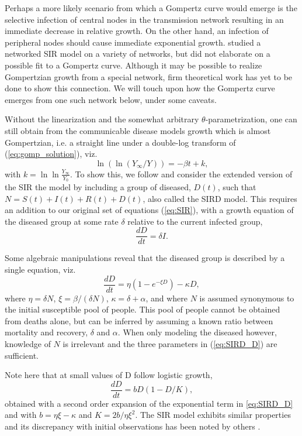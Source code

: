 \documentclass{article}
\begin{document}
 Perhaps a more likely scenario from which a Gompertz curve would emerge is the selective infection of central nodes in the transmission network resulting in an immediate decrease in relative growth. 
 On the other hand, an infection of peripheral nodes should cause immediate exponential growth. 
 \citet{herrmann2020covid} studied a networked SIR model on a variety of networks, but did not elaborate on a possible fit to a Gompertz curve. 
 Although it may be possible to realize Gompertzian growth from a special network, firm theoretical work has yet to be done to show this connection. 
 We will touch upon how the Gompertz curve emerges from one such network below, under some caveats.

Without the linearization and the somewhat arbitrary $\theta$-parametrization, one can still obtain from the communicable disease models growth which is almost Gompertzian, i.e. a straight line under a double-log transform of (\ref{eq:gomp_solution}), viz.
\begin{equation}
\label{eq:GOMP_D}
\ln{(\ln{(Y_{\infty}/Y)})} = -\beta t + k,
\end{equation}
with $k=\ln{\ln{\frac{Y_{\infty}}{Y_{0}}}}$. To show this, we follow \citet{carletti2020covid} and consider the extended version of the SIR the model by including a group of diseased, $D(t)$, such that $N = S(t) + I(t) + R(t) + D(t)$, also called the SIRD model. This requires an addition to our original set of equations (\ref{eq:SIR}), with a growth equation of the diseased group at some rate $\delta$ relative to the current infected group,
\begin{equation}
\frac{dD}{dt} = \delta I.
\end{equation}

Some algebraic manipulations reveal that the diseased group is described by a single equation, viz.
\begin{equation}
\label{eq:SIRD_D}
\frac{dD}{dt} = \eta( 1 - e^{-\xi D}) - \kappa D,
\end{equation}
where $\eta = \delta N$, $\xi = \beta/(\delta N)$, $\kappa = \delta + \alpha$, and where $N$ is assumed synonymous to the initial susceptible pool of people. This pool of people cannot be obtained from deaths alone, but can be inferred by assuming a known ratio between mortality and recovery, $\delta$ and $\alpha$. 
When only modeling the diseased however, knowledge of $N$ is irrelevant and the three parameters in (\ref{eq:SIRD_D}) are sufficient.

Note here that at small values of D follow logistic growth,
\begin{equation}
\frac{dD}{dt} = b D (1 - D/K),
\end{equation}
obtained with a second order expansion of the exponential term in \ref{eq:SIRD_D} and with $b=\eta\xi - \kappa$ and $K=2b/\eta\xi^2$. The SIR model exhibits similar properties and its discrepancy with initial observations has been noted by others \citep{vattay2020forecasting}.
\end{document}
